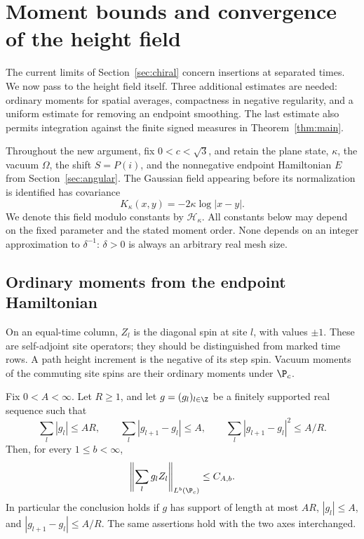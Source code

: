 \section{Moment bounds and convergence of the height field}\label{sec:probability}

The current limits of Section~\ref{sec:chiral} concern insertions at
separated times. We now pass to the height field itself. Three additional
estimates are needed: ordinary moments for spatial averages, compactness
in negative regularity, and a uniform estimate for removing an endpoint
smoothing. The last estimate also permits integration against the finite
signed measures in Theorem~\ref{thm:main}.

Throughout the new argument, fix \(0<c<\sqrt3\), and retain the plane state,
\(\kappa\), the vacuum \(\Omega\), the shift \(S=P(i)\), and the
nonnegative endpoint Hamiltonian \(E\) from Section~\ref{sec:angular}.
The Gaussian field appearing before its normalization is identified has
covariance
\begin{equation}\label{eq:prob-log-kernel}
 K_\kappa(x,y)=-2\kappa\log|x-y|.
\end{equation}
We denote this field modulo constants by \(\mathcal H_\kappa\).
All constants below may depend on the fixed parameter and the stated
moment order. None depends on an integer approximation to \(\delta^{-1}\):
\(\delta>0\) is always an arbitrary real mesh size.

\subsection{Ordinary moments from the endpoint Hamiltonian}

On an equal-time column, \(Z_l\) is the diagonal spin at site \(l\), with
values \(\pm1\). These are self-adjoint site operators; they should be
distinguished from marked time rows. A path height increment is the
negative of its step spin. Vacuum moments of the commuting site spins
are their ordinary moments under \(\P_c\).

\begin{lemma}\label{lem:ordinary-moments}
Fix \(0<A<\infty\). Let \(R\ge1\), and let \(g=(g_l)_{l\in\Z}\) be a
finitely supported real sequence such that
\begin{equation}\label{eq:prob-g-conditions}
 \sum_l|g_l|\le AR,\qquad
 \sum_l|g_{l+1}-g_l|\le A,\qquad
 \sum_l|g_{l+1}-g_l|^2\le A/R.
\end{equation}
Then, for every \(1\le b<\infty\),
\begin{equation}\label{eq:prob-ordinary-moments}
 \left\|\sum_lg_lZ_l\right\|_{L^b(\P_c)}\le C_{A,b}.
\end{equation}
In particular the conclusion holds if \(g\) has support of length at
most \(AR\), \(|g_l|\le A\), and
\(|g_{l+1}-g_l|\le A/R\). The same assertions hold with the two axes
interchanged.
\end{lemma}


